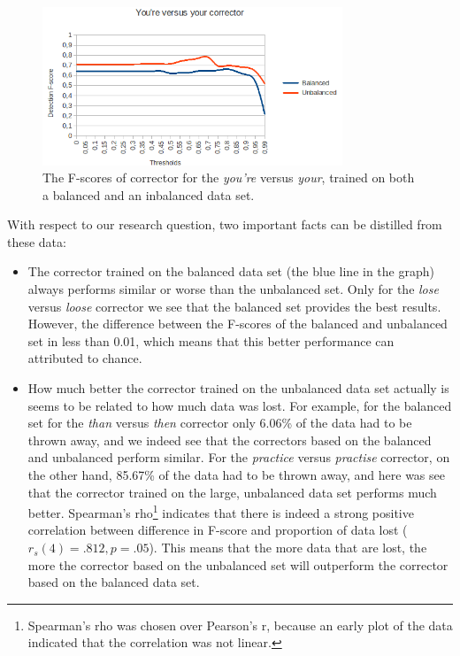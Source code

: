 \documentclass[12pt]{article}
\begin{document}
\begin{figure}[H]
\centering
\includegraphics[width=0.8\textwidth]{fscore_you'reyour.png}
\caption{The F-scores of corrector for the \emph{you're} versus \emph{your}, trained on both a balanced and an inbalanced data set.}
\end{figure}

With respect to our research question, two important facts can be distilled from these data:

\begin{itemize}

\item The corrector trained on the balanced data set (the blue line in the graph) always performs similar or worse than the unbalanced set. Only for the \emph{lose} versus \emph{loose} corrector we see that the balanced set provides the best results. However, the difference between the F-scores of the balanced and unbalanced set in less than 0.01, which means that this better performance can attributed to chance.
\item How much better the corrector trained on the unbalanced data set actually is seems to be related to how much data was lost. For example, for the balanced set for the \emph{than} versus \emph{then} corrector only 6.06\% of the data had to be thrown away, and we indeed see that the correctors based on the balanced and unbalanced perform similar. For the \emph{practice} versus \emph{practise} corrector, on the other hand, 85.67\% of the data had to be thrown away, and here was see that the corrector trained on the large, unbalanced data set performs much better. Spearman's rho\footnote{Spearman's rho was chosen over Pearson's r, because an early plot of the data indicated that the correlation was not linear.} indicates that there is indeed a strong positive correlation between difference in F-score and proportion of data lost ($r_s(4)=.812, p=.05$). This means that the more data that are lost, the more the corrector based on the unbalanced set will outperform the corrector based on the balanced data set.


\end{itemize}
\end{document}
